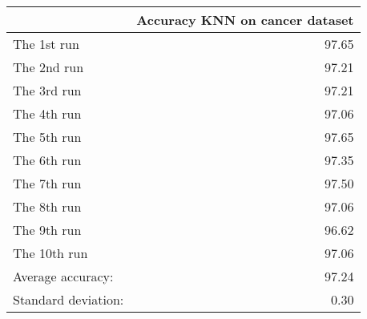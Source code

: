 \begin{tabular}{lr}
\toprule
{} &  Accuracy KNN on cancer dataset \\
\midrule
The 1st run         &                           97.65 \\
The 2nd run         &                           97.21 \\
The 3rd run         &                           97.21 \\
The 4th run         &                           97.06 \\
The 5th run         &                           97.65 \\
The 6th run         &                           97.35 \\
The 7th run         &                           97.50 \\
The 8th run         &                           97.06 \\
The 9th run         &                           96.62 \\
The 10th run        &                           97.06 \\
Average accuracy:   &                           97.24 \\
Standard deviation: &                            0.30 \\
\bottomrule
\end{tabular}
